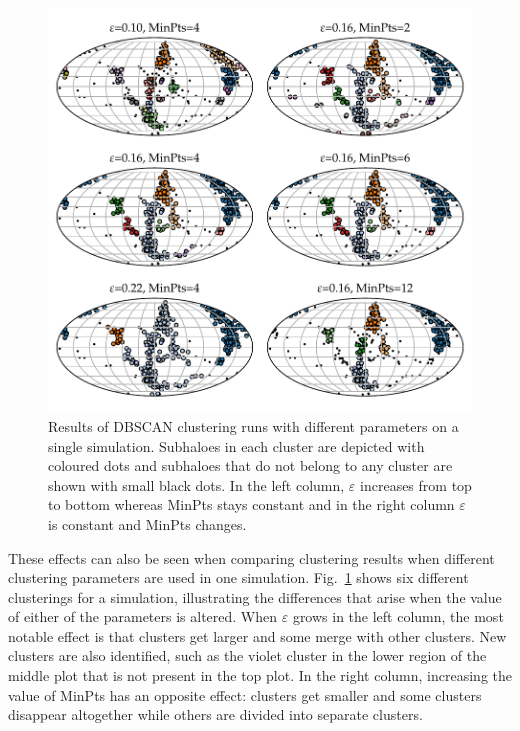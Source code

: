 \documentclass[english, oneside]{HYgradu}
\begin{document}
\begin{figure}
    \centering
    \includegraphics{kuvat/clusteringExamples.pdf}
    \caption{Results of DBSCAN clustering runs with different parameters on a single simulation. Subhaloes in each cluster are depicted with coloured dots and subhaloes that do not belong to any cluster are shown with small black dots. In the left column, $\varepsilon$ increases from top to bottom whereas MinPts stays constant and in the right column $\varepsilon$ is constant and MinPts changes.}\label{fig:clusteringExamples}
\end{figure}

These effects can also be seen when comparing clustering results when different clustering parameters are used in one simulation. Fig.~\ref{fig:clusteringExamples} shows six different clusterings for a simulation, illustrating the differences that arise when the value of either of the parameters is altered. When $\varepsilon$ grows in the left column, the most notable effect is that clusters get larger and some merge with other clusters. New clusters are also identified, such as the violet cluster in the lower region of the middle plot that is not present in the top plot. In the right column, increasing the value of MinPts has an opposite effect: clusters get smaller and some clusters disappear altogether while others are divided into separate clusters.
\end{document}

